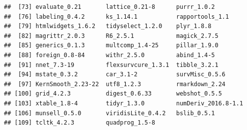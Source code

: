\documentclass[
]{article}
\begin{document}
\begin{verbatim}
##  [73] evaluate_0.21       lattice_0.21-8      purrr_1.0.2        
##  [76] labeling_0.4.2      ks_1.14.1           rapportools_1.1    
##  [79] htmlwidgets_1.6.2   tidyselect_1.2.0    plyr_1.8.8         
##  [82] magrittr_2.0.3      R6_2.5.1            magick_2.7.5       
##  [85] generics_0.1.3      multcomp_1.4-25     pillar_1.9.0       
##  [88] foreign_0.8-84      withr_2.5.0         abind_1.4-5        
##  [91] nnet_7.3-19         flexsurvcure_1.3.1  tibble_3.2.1       
##  [94] mstate_0.3.2        car_3.1-2           survMisc_0.5.6     
##  [97] KernSmooth_2.23-22  utf8_1.2.3          rmarkdown_2.24     
## [100] grid_4.2.3          digest_0.6.33       webshot_0.5.5      
## [103] xtable_1.8-4        tidyr_1.3.0         numDeriv_2016.8-1.1
## [106] munsell_0.5.0       viridisLite_0.4.2   bslib_0.5.1        
## [109] tcltk_4.2.3         quadprog_1.5-8
\end{verbatim}
\end{document}
